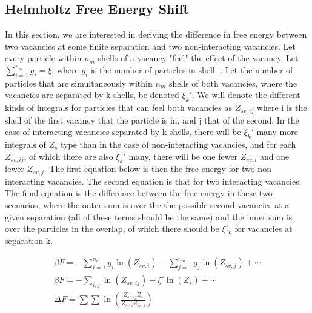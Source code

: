 \documentclass[paper=a4, fontsize=11pt]{scrartcl} %
\numberwithin{equation}{section} %
\numberwithin{figure}{section} %
\numberwithin{table}{section} %
\begin{document}
\subsection{Helmholtz Free Energy Shift}
In this section, we are interested in deriving the difference in free energy
between two vacancies at some finite separation and two non-interacting vacancies.
Let every particle within $n_m$ shells of a vacancy "feel" the effect of the
vacancy.  Let $\sum\limits_{i=1}^{n_m} g_i = \xi$, where $g_i$ is the number
of particles in shell i. Let the number of particles that are simultaneously
within $n_m$ shells of both vacancies, where the vacancies are separated by
k shells, be denoted $\xi_k'$.  We will denote the different kinds of integrals
for particles that can feel both vacancies as $Z_{sv,ij}$ where i is the
shell of the first vacancy that the particle is in, and j that of the second.
In the case of interacting vacancies separated by k shells, there will be 
$\xi_k'$ many more integrals of $Z_s$ type than in the case of non-interacting
vacancies, and for each $Z_{sv,ij}$, of which there are also $\xi_k'$ many,
there will be one fewer $Z_{sv,i}$ and one fewer $Z_{sv,j}$.  The first equation below is then the free energy for two non-interacting vacancies.  The second equation is that for two interacting vacancies.  The final equation is the difference between the free
energy in these two scenarios, where the outer sum is over the the possible second vacancies at a given separation (all of these terms should be the same) and the inner sum is over the particles in the overlap, of which there should be $\xi'_k$ for vacancies at separation k.

\begin{align}
  \beta F = -\sum\limits_{i=1}^{n_m} g_i \ln(Z_{sv,i}) - 
             \sum\limits_{j=1}^{n_m} g_j \ln(Z_{sv,j}) + \cdots\\
  \beta F = -\sum\limits_{i,j}\ln(Z_{sv,ij})-\xi'\ln(Z_s) + \cdots\\
  \Delta F = \sum\sum \ln\left(\frac{Z_{sv,ij}Z_s}{Z_{sv,i}Z_{sv,j}}\right)
\end{align}

\end{document}
